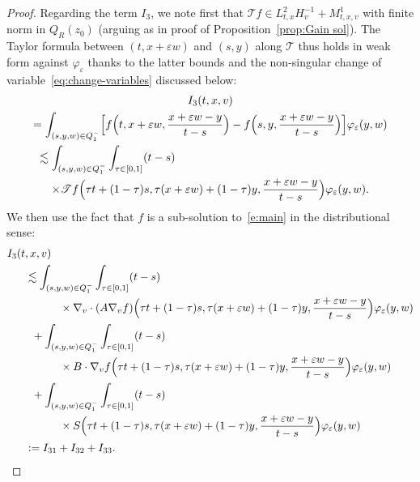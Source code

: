 \documentclass[JEP,XML,SOM,Unicode,NoFloatCountersInSection,published]{cedram}
\let\mathcal\mathscr
\theoremstyle{definition}
\theoremstyle{remark}
\newcommand{\cT}{\mathcal T}
\let\var\varepsilon
\begin{document}
\begin{proof}
Regarding the term $I_3$, we note first that
$\cT f \in L^2_{t,x} H^{-1}_v + M^1_{t,x,v}$ with finite norm
in $Q_R(z_0)$ (arguing as in proof of
Proposition~\ref{prop:Gain sol}). The Taylor formula between
$(t,x+\varepsilon w)$ and $(s,y)$ along $\cT$ thus holds in
weak form against $\varphi_\var$ thanks to the latter bounds
and the non-singular change of
variable~\eqref{eq:change-variables} discussed below:\vspace*{-5pt}
\begin{multline}\label{eq:Taylor-weak}
I_3(t,x,v)\\
= \int_{(s,y,w)\in Q_1^{-}} \Bigl[
f\Bigl(t,x+\varepsilon w,\frac{x+\varepsilon w
-y}{t-s}\Bigr)-f\Bigl(s,y,\frac{x+\varepsilon w
-y}{t-s}\Bigr)\Bigr] \varphi_\var(y,w)\\
\shoveleft{\hspace*{-1mm}\lesssim \int_{(s,y,w)\in Q_1^{-}} \int_{\tau \in
[0,1]} (t-s)}\\
\times \cT
f\Bigl(\tau t+(1-\tau)s,\tau (x+\varepsilon
w)+(1-\tau)y,\frac{x+\varepsilon w
-y}{t-s}\Bigr)\varphi_\var(y,w).
\end{multline}
We then use the fact that $f$ is a sub-solution
to~\eqref{e:main} in the distributional sense:\vspace*{-5pt}
\begin{align*}
I_3(t&,x,v)\\
&\lesssim \int_{(s,y,w)\in Q_1^{-}} \int_{\tau \in
[0,1]} (t-s) \\
&\hspace*{1.1cm}\times \nabla_v \cdot (A \nabla_v f)\Bigl(\tau
t+(1-\tau)s,\tau (x+\varepsilon
w)+(1-\tau)y,\frac{x+\varepsilon w
-y}{t-s}\Bigr)\varphi_\var(y,w)\\
&\hspace*{.2cm}+\int_{(s,y,w)\in Q_1^{-}} \int_{\tau \in
[0,1]} (t-s) \\
&\hspace*{1.1cm}\times
B\cdot \nabla_v f\Bigl(\tau t+(1-\tau)s,\tau
(x+\varepsilon w)+(1-\tau)y,\frac{x+\varepsilon w
-y}{t-s}\Bigr)\varphi_\var(y,w)\\
&\hspace*{.2cm}+ \int_{(s,y,w)\in Q_1^{-}} \int_{\tau \in
[0,1]} (t-s) \\
&\hspace*{1.1cm}\times S\Bigl(\tau t+(1-\tau)s,\tau (x+\varepsilon
w)+(1-\tau)y,\frac{x+\varepsilon w
-y}{t-s}\Bigr)\varphi_\var(y,w)\\
&:= I_{31}+I_{32}+I_{33}.
\end{align*}

\end{proof}
\end{document}
